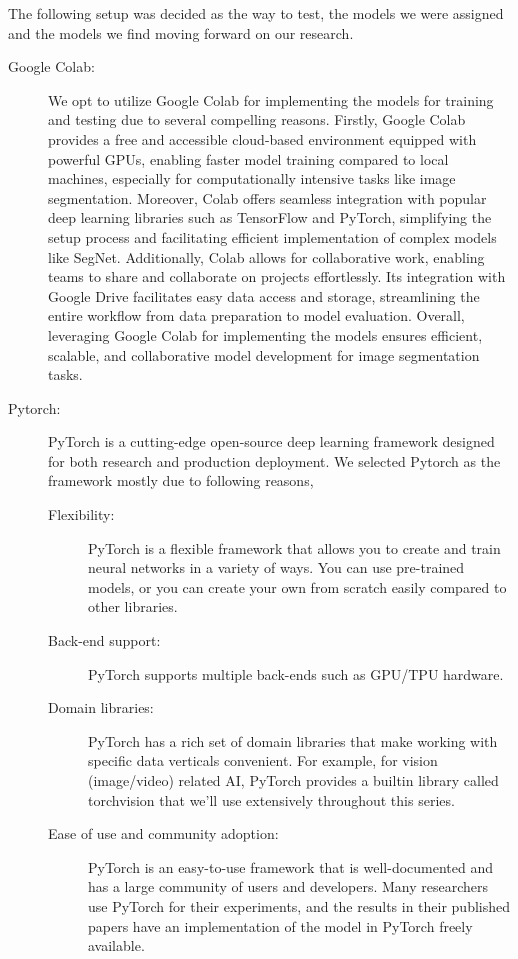 The following setup was decided as the way to test, the models we were assigned and the models we find moving forward on our research.

\begin{description}
  \item[Google Colab:] We opt to utilize Google Colab for implementing the models for training and testing due to several compelling reasons. Firstly, Google Colab provides a free and accessible cloud-based environment equipped with powerful GPUs, enabling faster model training compared to local machines, especially for computationally intensive tasks like image segmentation. Moreover, Colab offers seamless integration with popular deep learning libraries such as TensorFlow and PyTorch, simplifying the setup process and facilitating efficient implementation of complex models like SegNet. Additionally, Colab allows for collaborative work, enabling teams to share and collaborate on projects effortlessly. Its integration with Google Drive facilitates easy data access and storage, streamlining the entire workflow from data preparation to model evaluation. Overall, leveraging Google Colab for implementing the models ensures efficient, scalable, and collaborative model development for image segmentation tasks.

  \item[Pytorch:] PyTorch is a cutting-edge open-source deep learning framework designed for both research and production deployment. We selected Pytorch as the framework mostly due to following reasons,

        \begin{description}
          \item[Flexibility:] PyTorch is a flexible framework that allows you to create and train neural networks in a variety of ways. You can use pre-trained models, or you can create your own from scratch easily compared to other libraries.
          \item[Back-end support:] PyTorch supports multiple back-ends such as GPU/TPU hardware.
          \item[Domain libraries:] PyTorch has a rich set of domain libraries that make working with specific data verticals convenient. For example, for vision (image/video) related AI, PyTorch provides a builtin library called torchvision that we'll use extensively throughout this series.
          \item[Ease of use and community adoption:] PyTorch is an easy-to-use framework that is well-documented and has a large community of users and developers. Many researchers use PyTorch for their experiments, and the results in their published papers have an implementation of the model in PyTorch freely available.
        \end{description}
\end{description}